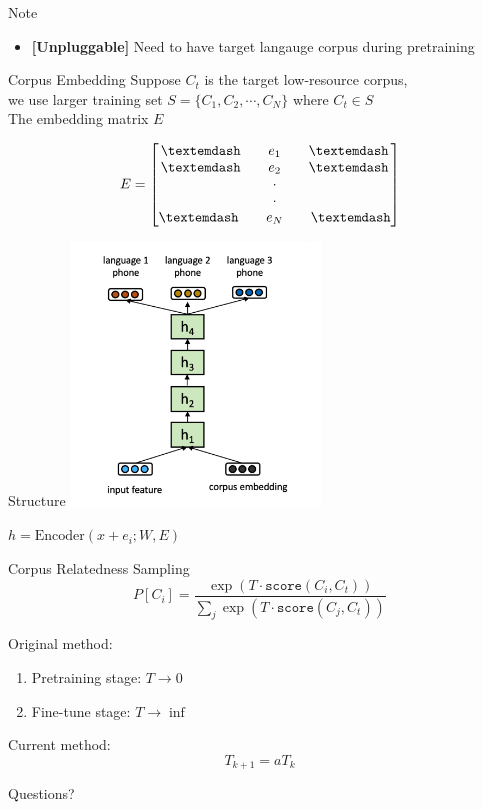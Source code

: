 \documentclass{beamer}
\begin{document}
\begin{frame}{Note}
  \begin{itemize}
    \item \textbf{[Unpluggable]} Need to have target langauge corpus during pretraining
  \end{itemize}
\end{frame}

\begin{frame}{Corpus Embedding}
  Suppose $C_t$ is the target low-resource corpus, \\ 
  we use larger training set $S = \lbrace C_1, C_2, \cdots, C_N \rbrace$ where $C_t \in S$ \\
  The embedding matrix $E$


  \[
    E = \begin{bmatrix}
    \textemdash \quad \quad e_1 \quad \quad \textemdash  \\
    \textemdash \quad \quad e_2 \quad \quad \textemdash \\
    \cdot\\
    \cdot\\
    \textemdash \quad \quad e_N \quad \quad \textemdash\\
\end{bmatrix}
  \]

\end{frame}

\begin{frame}{Structure}
  \center \includegraphics[width=0.5\textwidth]{fig/CRS-struct.png}

    $h = \text{Encoder}(x + e_i;W,E)$
\end{frame}

\begin{frame}{Corpus Relatedness Sampling}
  \[
  P [C_i] = \frac{\exp (T \cdot \texttt{score} (C_i, C_t))}{\sum_j \exp (T \cdot \texttt{score} (C_j, C_t))}
\]

Original method:
\begin{enumerate}
  \item Pretraining stage: $T \rightarrow 0$
  \item Fine-tune stage: $T \rightarrow \inf$
\end{enumerate}
Current method:
\[
  T_{k+1} = a T_k
\]
\end{frame}


\begin{frame}
	\begin{center}
    \LARGE{Questions?}
	\end{center}
\end{frame}
\end{document}
